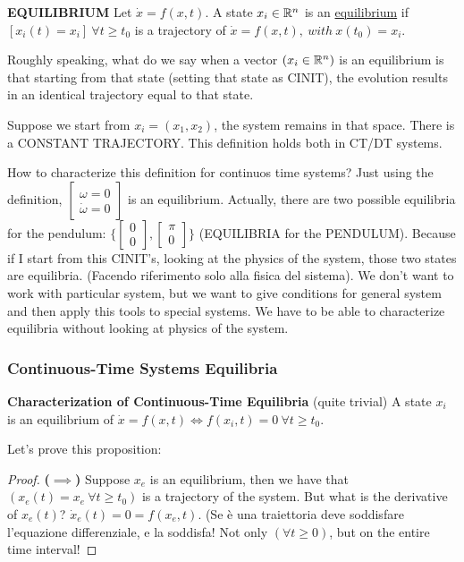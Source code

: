 \begin{defn}{\textbf{EQUILIBRIUM}}
Let $\dot{x}=f(x,t)$. A state $x_i \in \mathbb{R}^n$ is an \underline{equilibrium} if $[x_i(t) = x_i]\ \forall t \geq t_0$ is a trajectory of $\dot{x}=f(x,t),\ with\ x(t_0) = x_i$.
\end{defn}

Roughly speaking, what do we say when a vector $(x_i \in \mathbb{R}^n)$ is an equilibrium is that starting from that state (setting that state as CINIT), the evolution results in an identical trajectory equal to that state.

Suppose we start from $x_i = (x_1,x_2)$, the system remains in that space. There is a CONSTANT TRAJECTORY. This definition holds both in CT/DT systems.

How to characterize this definition for continuos time systems? Just using the definition, $\begin{bmatrix}\omega = 0 \\ \dot{\omega} = 0\end{bmatrix}$ is an equilibrium. Actually, there are two possible equilibria for the pendulum: $\{\begin{bmatrix}0 \\ 0\end{bmatrix}, \begin{bmatrix}\pi \\ 0\end{bmatrix}\}$ (EQUILIBRIA for the PENDULUM). Because if I start from this CINIT's, looking at the physics of the system, those two states are equilibria. (Facendo riferimento solo alla fisica del sistema). We don't want to work with particular system, but we want to give conditions for general system and then apply this tools to special systems. We have to be able to characterize equilibria without looking at physics of the system.

\subsubsection{Continuous-Time Systems Equilibria}

\begin{prop}{\textbf{Characterization of Continuous-Time Equilibria} (quite trivial)}
A state $x_i$ is an equilibrium of $\dot{x}=f(x,t) \iff f(x_i,t) = 0\ \forall t \geq t_0$.
\end{prop}

Let's prove this proposition:


\begin{proof}{\textbf{($\implies$)}}
Suppose $x_e$ is an equilibrium, then we have that $(x_e(t) = x_e\ \forall t \geq t_0)$ is a trajectory of the system. But what is the derivative of $x_e(t)$?
$\dot{x}_e(t) = 0 = f(x_e,t)$. (Se è una traiettoria deve soddisfare l'equazione differenziale, e la soddisfa! Not only $(\forall t \geq 0)$, but on the entire time interval!
\end{proof}

